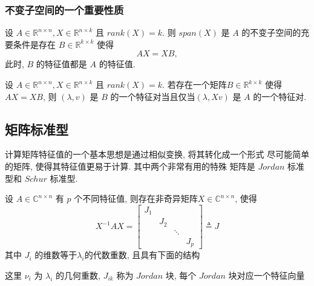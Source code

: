 \documentclass[12pt,a4paper]{article}
\begin{document}
\subsubsection{不变子空间的一个重要性质}

\begin{theorem}
	设 $A ∈ \mathbb{R}^{n×n}, X ∈ \mathbb{R}^{n×k}$ 且 $rank(X) = k$. 则 $span(X)$ 是 $A$ 的不变子空间的充要条件是存在 $B ∈ \mathbb{R}^{k×k}$ 使得
	$$AX = XB,$$
	此时, $B$ 的特征值都是 $A$ 的特征值. 
\end{theorem}



\begin{corollary}
	设 $A ∈ \mathbb{R}^{n×n}, X ∈ \mathbb{R}^{n×k}$ 且 $rank(X) = k$. 若存在一个矩阵$B ∈ \mathbb{R}^{k×k}$ 使得 $AX = XB$, 则 $(λ, v)$ 是 $B$ 的一个特征对当且仅当$(λ, Xv)$ 是 $A$ 的一个特征对.
\end{corollary}


\subsection{矩阵标准型}
计算矩阵特征值的一个基本思想是通过相似变换, 将其转化成一个形式
尽可能简单的矩阵, 使得其特征值更易于计算. 其中两个非常有用的特殊
矩阵是 $Jordan$ 标准型和 $Schur$ 标准型.


\begin{theorem}
	设 $A ∈ \mathbb{C}^{n×n}$ 有 $p$ 个不同特征值, 则存在非奇异矩阵$ X ∈ \mathbb{C}^{n×n}$, 使得
	$$
	X^{-1} A X=\left[\begin{array}{cccc}{J_{1}} & {} & {} & {} \\ {} & {J_{2}} & {} \\ {} & {} & {\ddots} & {} \\ {} & {} & {} & {J_{p}}\end{array}\right] \triangleq J
	$$
	其中 $J_i$ 的维数等于$ λ_i $的代数重数, 且具有下面的结构
	
	
	这里 $ν_i$ 为 $λ_i$ 的几何重数, $J_{ik}$ 称为 $Jordan$ 块, 每个 $Jordan$ 块对应一个特征向量	
\end{theorem}
\end{document}

